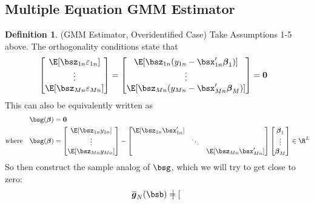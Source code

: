 \documentclass[12pt]{article}
\theoremstyle{plain}
\theoremstyle{definition}
\newtheorem{defn}[thm]{Definition}
\theoremstyle{remark}
\newcommand{\bsbeta}{\boldsymbol{\beta}}
\newcommand{\bsbarg}{\boldsymbol{\overline{g}}}
\renewcommand{\bso}{\boldsymbol{0}}
\begin{document}
\clearpage
\subsection{Multiple Equation GMM Estimator}
\label{subsec:EndogenousRegressorMultipleGMM}

\begin{defn}(GMM Estimator, Overidentified Case)
Take Assumptions 1-5 above. The orthogonality conditions state that
\begin{align*}
  \begin{bmatrix}
    \E[\bsz_{1n}\varepsilon_{1n}] \\
    \vdots\\
    \E[\bsz_{Mn}\varepsilon_{Mn}]
  \end{bmatrix}
  =
  \begin{bmatrix}
    \E[\bsz_{1n}(y_{1n}-\bsx_{1n}'\bsbeta_1)] \\
    \vdots\\
    \E[\bsz_{Mn}(y_{Mn}-\bsx_{Mn}'\bsbeta_M)] \\
  \end{bmatrix}
  &=
  \bso
\end{align*}
This can also be equivalently written as
\begin{align*}
  \bsg(\bsbeta) &= \bso \\
  \text{where}\quad
  \bsg(\bsbeta) &=
  \begin{bmatrix}
    \E[\bsz_{1n}y_{1n}] \\
    \vdots\\
    \E[\bsz_{Mn}y_{Mn}] \\
  \end{bmatrix}
  -
  \begin{bmatrix}
    \E[\bsz_{1n}\bsx_{1n}'] &  &\\
    & \ddots & \\
    && \E[\bsz_{Mn}\bsx_{Mn}'] \\
  \end{bmatrix}
  \begin{bmatrix}
    \bsbeta_1 \\
    \vdots \\
    \bsbeta_M \\
  \end{bmatrix} \in \R^L
\end{align*}
So then construct the sample analog of $\bsg$, which we will try to get
close to zero:
\begin{align*}
  \bsbarg_N(\bsb) &=
  \begin{bmatrix}

\end{bmatrix}
\end{align*}
\end{defn}
\end{document}
